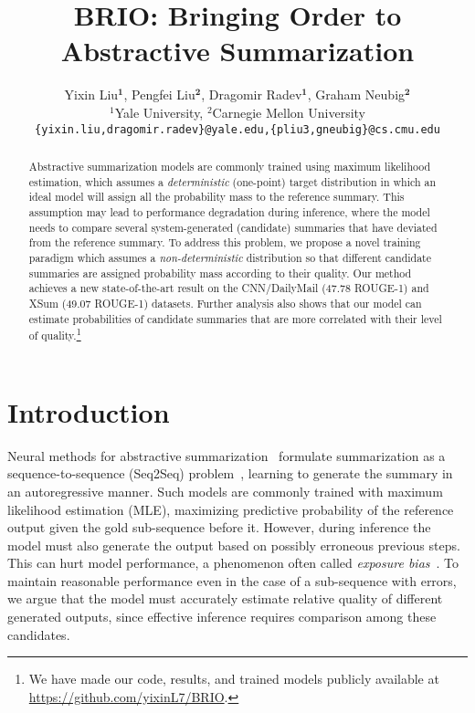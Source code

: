 \documentclass[11pt]{article}
\title{BRIO: Bringing Order to Abstractive Summarization}
\author{Yixin Liu$^\textbf{1}$, Pengfei Liu$^\textbf{2}$, Dragomir Radev$^\textbf{1}$, Graham Neubig$^\textbf{2}$ \\
$^1$Yale University, $^2$Carnegie Mellon University \\
\texttt{\{yixin.liu,dragomir.radev\}@yale.edu,\{pliu3,gneubig\}@cs.cmu.edu}
  }
\begin{document}
\maketitle
\begin{abstract}

Abstractive summarization models are commonly trained using maximum likelihood estimation, which assumes a \textit{deterministic} (one-point) target distribution in which an ideal model will assign all the probability mass to the reference summary.
This assumption may lead to performance degradation during inference, where the model needs to compare several system-generated (candidate) summaries that have deviated from the reference summary.
To address this problem, we propose a novel training paradigm which assumes a \textit{non-deterministic} distribution so that different candidate summaries are assigned probability mass according to their quality. 
Our method achieves a new state-of-the-art result on the CNN/DailyMail (47.78 ROUGE-1) and XSum (49.07 ROUGE-1) datasets.
Further analysis also shows that our model can estimate probabilities of candidate summaries that are more correlated with their level of quality.\footnote{We have made our code, results, and trained models publicly available at \url{https://github.com/yixinL7/BRIO}.}

\end{abstract}

\section{Introduction}

Neural methods for abstractive summarization~\cite{rush-etal-2015-neural, nallapati-etal-2016-abstractive, chopra-etal-2016-abstractive, lewis-etal-2020-bart, zhang2020pegasus} formulate summarization as a sequence-to-sequence (Seq2Seq) problem~\citep{10.5555/2969033.2969173}, learning to generate the summary in an autoregressive manner.
Such models are commonly trained with maximum likelihood estimation (MLE), maximizing predictive probability of the reference output given the gold sub-sequence before it.
However, during inference the model must also generate the output based on possibly erroneous previous steps. This can hurt model performance, a phenomenon often called \textit{exposure bias}~\citep{10.5555/2969239.2969370, DBLP:journals/corr/RanzatoCAZ15}.
To maintain reasonable performance even in the case of a sub-sequence with errors, we argue that the model must accurately estimate relative quality of different generated outputs, since effective inference requires comparison among these candidates. 
\end{document}
